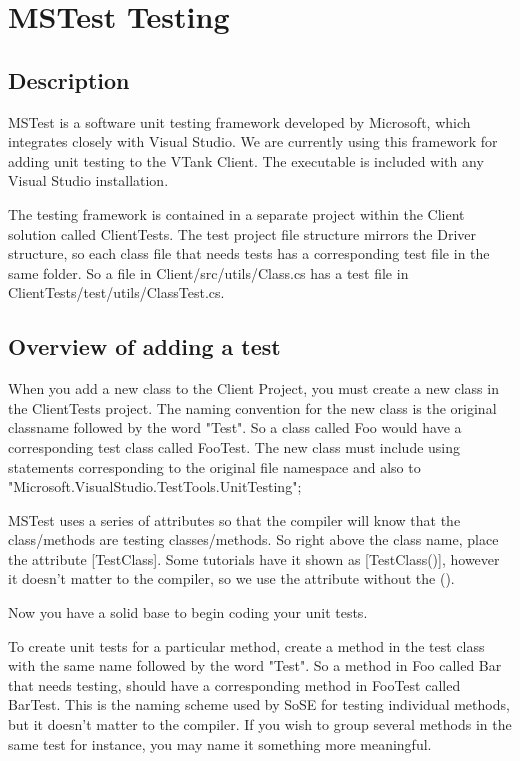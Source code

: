 \section{MSTest Testing} 

\subsection{Description}
MSTest is a software unit testing framework developed by Microsoft, which integrates closely with Visual Studio. We are currently using this framework for adding unit testing to the VTank Client. The executable is included with any Visual Studio installation. 

The testing framework is contained in a separate project within the Client solution called ClientTests. The test project file structure mirrors the Driver structure, so each class file that needs tests has a corresponding test file in the same folder. So a file in Client/src/utils/Class.cs has a test file in ClientTests/test/utils/ClassTest.cs.

\subsection{Overview of adding a test}

When you add a new class to the Client Project, you must create a new class in the ClientTests project. The naming convention for the new class is the original classname followed by the word "Test". So a class called Foo would have a corresponding test class called FooTest. The new class must include using statements corresponding to the original file namespace and also to "Microsoft.VisualStudio.TestTools.UnitTesting"; 

MSTest uses a series of attributes so that the compiler will know that the class/methods are testing classes/methods. So right above the class name, place the attribute [TestClass]. Some tutorials have it shown as [TestClass()], however it doesn't matter to the compiler, so we use the attribute without the (). 

Now you have a solid base to begin coding your unit tests. 

To create unit tests for a particular method, create a method in the test class with the same name followed by the word "Test". So a method in Foo called Bar that needs testing, should have a corresponding method in FooTest called BarTest. This is the naming scheme used by SoSE for testing individual methods, but it doesn't matter to the compiler. If you wish to group several methods in the same test for instance, you may name it something more meaningful. 

